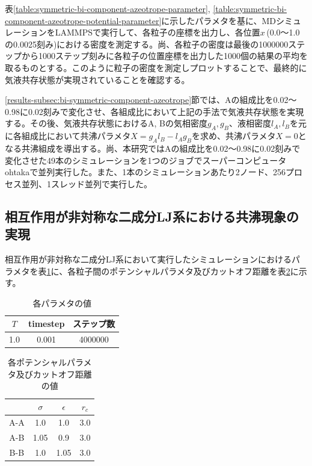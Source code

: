\documentclass[titlepage]{jsreport}
\begin{document}
\newpage
表\ref{table:symmetric-bi-component-azeotrope-parameter}, \ref{table:symmetric-bi-component-azeotrope-potential-parameter}に示したパラメタを基に、MDシミュレーションをLAMMPSで実行して、各粒子の座標を出力し、各位置$x$\,(0.0〜1.0の0.0025刻み)における密度を測定する。尚、各粒子の密度は最後の1000000ステップから1000ステップ刻みに各粒子の位置座標を出力した1000個の結果の平均を取るものとする。このように粒子の密度を測定しプロットすることで、最終的に気液共存状態が実現されていることを確認する。

\ref{results-subsec:bi-symmetric-component-azeotrope}節では、Aの組成比を0.02〜0.98に0.02刻みで変化させ、各組成比において上記の手法で気液共存状態を実現する。その後、気液共存状態におけるA, Bの気相密度$g_A, g_B$、液相密度$l_A, l_B$を元に各組成比において共沸パラメタ$X=g_Al_B-l_Ag_B$を求め、共沸パラメタ$X=0$となる共沸組成を導出する。尚、本研究ではAの組成比を0.02〜0.98に0.02刻みで変化させた49本のシミュレーションを1つのジョブでスーパーコンピュータohtakaで並列実行した。また、1本のシミュレーションあたり2ノード、256プロセス並列、1スレッド並列で実行した。


\subsection{相互作用が非対称な二成分LJ系における共沸現象の実現} \label{method-subsec:bi-asymmetric-component-azeotrope}
相互作用が非対称な二成分LJ系において実行したシミュレーションにおけるパラメタを表\ref{table:asymmetric-bi-component-azeotrope-parameter}に、各粒子間のポテンシャルパラメタ及びカットオフ距離を表\ref{table:asymmetric-bi-component-azeotrope-potential-parameter}に示す。

\begin{table}[htbp]
    \begin{center}
        \caption{各パラメタの値}
        \label{table:asymmetric-bi-component-azeotrope-parameter}
            \begin{tabular}{c c c}
                $T$ & timestep & ステップ数 \\
                \hline
                1.0 & 0.001 & 4000000 \\
            \end{tabular}
    \end{center}
\end{table}

\begin{table}[htbp]
    \begin{center}
        \caption{各ポテンシャルパラメタ及びカットオフ距離の値}
        \label{table:asymmetric-bi-component-azeotrope-potential-parameter}
            \begin{tabular}{c c c c}
                & $\sigma$ & $\epsilon$ & $r_c$ \\
                \hline
                A-A & 1.0 & 1.0 & 3.0 \\
                A-B & 1.05 & 0.9 & 3.0 \\
                B-B & 1.0 & 1.05 & 3.0
            \end{tabular}
    \end{center}
\end{table}
\end{document}
